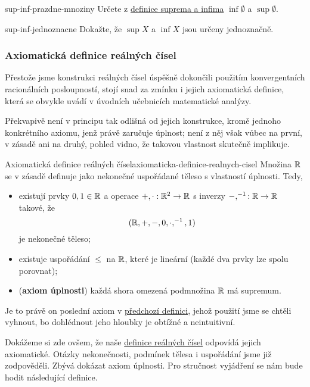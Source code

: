 \begin{exercise}{}{sup-inf-prazdne-mnoziny}
 Určete z \hyperref[def:supremum-a-infimum]{definice suprema a infima} $\inf
 \emptyset$ a $\sup \emptyset$.
\end{exercise}

\begin{exercise}{}{sup-inf-jednoznacne}
 Dokažte, že $\sup X$ a $\inf X$ jsou určeny jednoznačně.
\end{exercise}

\subsubsection{Axiomatická definice reálných čísel}
\label{sssec:axiomaticka-definice-realnych-cisel}

Přestože jsme konstrukci reálných čísel úspěšně dokončili použitím
konvergentních racionálních posloupností, stojí snad za zmínku i jejich
axiomatická definice, která se obvykle uvádí v úvodních učebnicích matematické
analýzy.

Překvapivě není v principu tak odlišná od jejich konstrukce, kromě jednoho
konkrétního axiomu, jenž právě zaručuje úplnost; není z něj však vůbec na první,
v zásadě ani na druhý, pohled vidno, že takovou vlastnost skutečně implikuje.

\begin{definition}{Axiomatická definice reálných
 čísel}{axiomaticka-definice-realnych-cisel}
 Množina $\mathbb{R}$ se v zásadě definuje jako nekonečné uspořádané těleso s vlastností
 úplnosti. Tedy,
 \begin{itemize}
  \item existují prvky $0,1 \in \mathbb{R}$ a operace $+, \cdot :\mathbb{R}^{2} \to \mathbb{R}$ s
   inverzy $-,^{-1}:\mathbb{R} \to \mathbb{R}$ takové, že
   \[
    (\mathbb{R},+,-,0, \cdot ,^{-1},1)
   \]
   je nekonečné těleso;
  \item existuje uspořádání $ \leq $ na $\mathbb{R}$, které je lineární (každé dva prvky
   lze spolu porovnat);
  \item (\textbf{axiom úplnosti}) každá shora omezená podmnožina $\mathbb{R}$ má
   supremum.
 \end{itemize}
\end{definition}

Je to právě on poslední axiom v
\hyperref[def:axiomaticka-definice-realnych-cisel]{předchozí definici}, jehož
použití jsme se chtěli vyhnout, bo dohlédnout jeho hloubky je obtížné a
neintuitivní.

Dokážeme si zde ovšem, že naše \hyperref[def:realna-cisla]{definice reálných
čísel} odpovídá jejich axiomatické. Otázky nekonečnosti, podmínek tělesa i
uspořádání jsme již zodpověděli. Zbývá dokázat axiom úplnosti. Pro stručnost
vyjádření se nám bude hodit následující definice.

